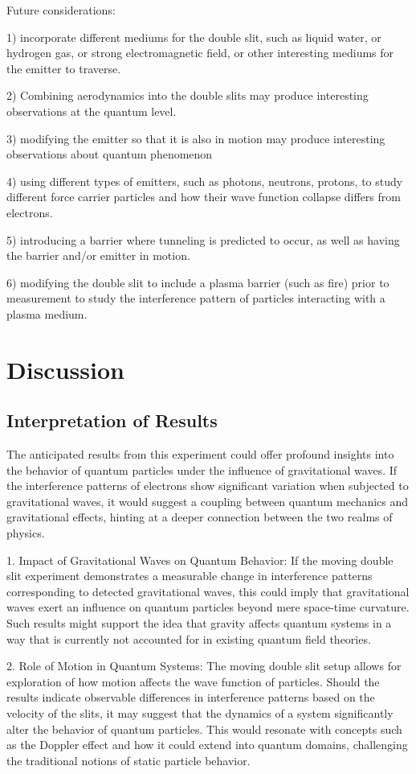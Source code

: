 \documentclass{article}
\begin{document}
Future considerations: 

1) incorporate different mediums for the double slit, such as liquid water, or hydrogen gas, or strong electromagnetic field, or other interesting mediums for the emitter to traverse. 

2) Combining aerodynamics into the double slits may produce interesting observations at the quantum level. 

3) modifying the emitter so that it is also in motion may produce interesting observations about quantum phenomenon 

4) using different types of emitters, such as photons, neutrons, protons, to study different force carrier particles and how their wave function collapse differs from electrons. 

5) introducing a barrier where tunneling is predicted to occur, as well as having the barrier and/or emitter in motion. 

6) modifying the double slit to include a plasma barrier (such as fire) prior to measurement to study the interference pattern of particles interacting with a plasma medium.

\section{Discussion}

\subsection{Interpretation of Results}
The anticipated results from this experiment could offer profound insights into the behavior of quantum particles under the influence of gravitational waves. If the interference patterns of electrons show significant variation when subjected to gravitational waves, it would suggest a coupling between quantum mechanics and gravitational effects, hinting at a deeper connection between the two realms of physics.

1. Impact of Gravitational Waves on Quantum Behavior: If the moving double slit experiment demonstrates a measurable change in interference patterns corresponding to detected gravitational waves, this could imply that gravitational waves exert an influence on quantum particles beyond mere space-time curvature. Such results might support the idea that gravity affects quantum systems in a way that is currently not accounted for in existing quantum field theories.

2. Role of Motion in Quantum Systems: The moving double slit setup allows for exploration of how motion affects the wave function of particles. Should the results indicate observable differences in interference patterns based on the velocity of the slits, it may suggest that the dynamics of a system significantly alter the behavior of quantum particles. This would resonate with concepts such as the Doppler effect and how it could extend into quantum domains, challenging the traditional notions of static particle behavior.
\end{document}
